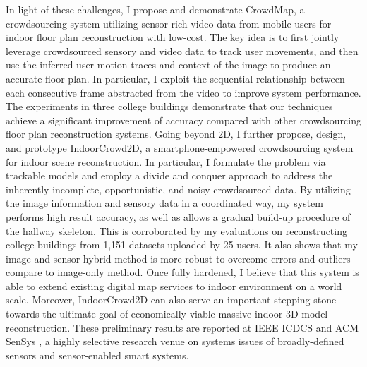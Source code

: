 \documentclass[11pt]{article}
\begin{document}
In light of these challenges, I propose and demonstrate CrowdMap, a crowdsourcing system utilizing sensor-rich video data from mobile users for indoor floor plan reconstruction with low-cost. The key idea is to first jointly leverage crowdsourced sensory and video data to track user movements, and then use the inferred user motion traces and context of the image to produce an accurate floor plan. In particular, I exploit the sequential relationship between each consecutive frame abstracted from the video to improve system performance. The experiments in three college buildings demonstrate that our techniques achieve a significant improvement of accuracy compared with other crowdsourcing floor plan reconstruction systems. Going beyond 2D, I further propose, design, and prototype IndoorCrowd2D, a smartphone-empowered crowdsourcing system for indoor scene reconstruction. In particular, I formulate the problem via trackable models and employ a divide and conquer approach to address the inherently incomplete, opportunistic, and noisy crowdsourced data. By utilizing the image information and sensory data in a coordinated way, my system performs high result accuracy, as well as allows a gradual build-up procedure of the hallway skeleton. This is corroborated by my evaluations on reconstructing college buildings from 1,151 datasets uploaded by 25 users. It also shows that my image and sensor hybrid method is more robust to overcome errors and outliers compare to image-only method. Once fully hardened, I believe that this system is able to extend existing digital map services to indoor environment on a world scale. Moreover, IndoorCrowd2D can also serve an important stepping stone towards the ultimate goal of economically-viable massive indoor 3D model reconstruction. These preliminary results are reported at IEEE ICDCS \cite{ICDCS15} and ACM SenSys \cite{Sensys15}, a highly selective research venue on systems issues of broadly-defined sensors and sensor-enabled smart systems. 
\end{document}
